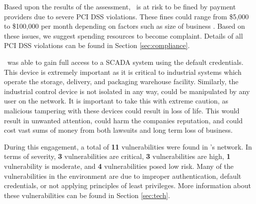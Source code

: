     Based upon the results of the assessment, \cptc\ is at risk to be fined by payment providers due to severe PCI DSS violations. These fines could range from \$5,000 to \$100,000 per month depending on factors such as size of business \cite{pcsdssfees}. Based on these issues, we suggest spending resources to become complaint. Details of all PCI DSS violations can be found in Section \ref{sec:compliance}. 
    
    \teamname\ was able to gain full access to a SCADA system using the default credentials. This device is extremely important as it is critical to industrial systems which operate the storage, delivery, and packaging warehouse facility. Similarly, the industrial control device is not isolated in any way, could be manipulated by any user on the network. It is important to take this with extreme caution, as malicious tampering with these devices could result in loss of life. This would result in unwanted attention, could harm the companies reputation, and could cost \cptc vast sums of money from both lawsuits and long term loss of business.
    
    During this engagement, a total of \textbf{11} vulnerabilities were found in \cptc's network. In terms of severity, \textbf{3} vulnerabilities are critical, \textbf{3} vulnerabilities are high, \textbf{1} vulnerability is moderate, and \textbf{4} vulnerabilities posed low risk. Many of the vulnerabilities in the environment are due to improper authentication, default credentials, or not applying principles of least privileges. More information about these vulnerabilities can be found in Section \ref{sec:tech}.